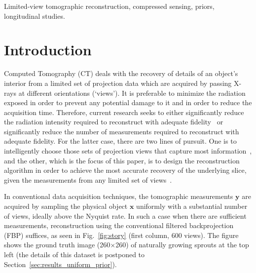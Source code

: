 \documentclass[journal]{IEEEtran}
\begin{document}
\begin{IEEEkeywords}
Limited-view tomographic reconstruction, compressed sensing, priors, longitudinal studies.
\end{IEEEkeywords}






%
\IEEEpeerreviewmaketitle



\section{Introduction}
\label{sec:intro}
Computed Tomography (CT) deals with the recovery of details of an
object's interior
from a limited set of projection data which are acquired by passing
X-rays at different orientations (`views'). It is preferable to
minimize the radiation exposed in order to prevent any potential
damage to it and in order to reduce the acquisition time. Therefore,
current research seeks to either significantly reduce the radiation
intensity required to reconstruct with adequate
fidelity~\cite{yang2018,Lin2016,Xie2017,gopal2019low} or significantly
reduce the number of measurements required to reconstruct with
adequate fidelity. For the latter case, there are two lines of
pursuit. One is to intelligently choose those sets of projection views
that capture most
information~\cite{King2018,Anthony2018,barkan17,fischer16,andrei14},
and the other, which is the focus of this paper, is to design the
reconstruction algorithm in order to achieve the most accurate
recovery of the underlying slice, given the measurements from any
limited set of views~\cite{yang2018,geyer2015,kilic2011}.

In conventional data acquisition techniques, the tomographic
measurements $\boldsymbol{y}$ are acquired by sampling the physical
object $\boldsymbol{x}$ uniformly with a substantial number of views,
ideally above the Nyquist rate. In such a case when there are
sufficient measurements, reconstruction using the conventional
filtered backprojection (FBP) suffices, as seen in
Fig.~\ref{fig:story} (first column, 600 views). The figure shows the
ground truth image (260$\times$260) of naturally growing sprouts at the top
left (the details of this dataset is postponed to
Section~\ref{sec:results_uniform_prior}).
\end{document}
